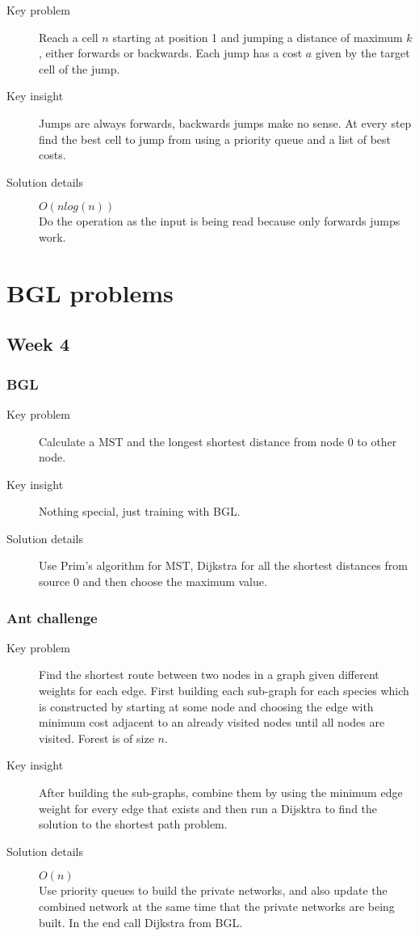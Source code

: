 \documentclass[11pt]{book}
\begin{document}
\begin{description}
	\item[Key problem] Reach a cell $n$ starting at position 1 and jumping a distance of maximum $k$, either forwards or backwards. Each jump has a cost $a$ given by the target cell of the jump.
	\item[Key insight] Jumps are always forwards, backwards jumps make no sense. At every step find the best cell to jump from using a priority queue and a list of best costs.
	\item[Solution details] $O(nlog(n))$ \\ Do the operation as the input is being read because only forwards jumps work.
\end{description}

\chapter{BGL problems}

\section{Week 4}

\subsection{BGL}

\begin{description}
	\item[Key problem] Calculate a MST and the longest shortest distance from node 0 to other node.
	\item[Key insight] Nothing special, just training with BGL.
	\item[Solution details] Use Prim's algorithm for MST, Dijkstra for all the shortest distances from source 0 and then choose the maximum value.
\end{description}

\subsection{Ant challenge}

\begin{description}
	\item[Key problem] Find the shortest route between two nodes in a graph given different weights for each edge. First building each sub-graph for each species which is constructed by starting at some node and choosing the edge with minimum cost adjacent to an already visited nodes until all nodes are visited. Forest is of size $n$.
	\item[Key insight] After building the sub-graphs, combine them by using the minimum edge weight for every edge that exists and then run a Dijsktra to find the solution to the shortest path problem.
	\item[Solution details] $O(n)$ \\ Use priority queues to build the private networks, and also update the combined network at the same time that the private networks are being built. In the end call Dijkstra from BGL.
\end{description}
\end{document}
